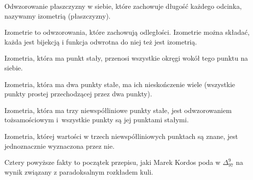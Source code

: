 
\begin{definition}
    Odwzorowanie płaszczyzny w siebie, które zachowuje długość każdego odcinka, nazywamy izometrią (płaszczyzny).
\end{definition}

Izometrie to odwzorowania, które zachowują odległości.
Izometrie można składać, każda jest bijekcją i funkcja odwrotna do niej też jest izometrią.

\begin{proposition}
\label{delta_1997_9_start}%
    Izometria, która ma punkt stały, przenosi wszystkie okręgi wokół tego punktu na siebie.
\end{proposition}

\begin{proposition}
    Izometria, która ma dwa punkty stałe, ma ich nieskończenie wiele (wszystkie punkty prostej przechodzącej przez dwa punkty).
\end{proposition}

\begin{proposition}
    Izometria, która ma trzy niewspółliniowe punkty stałe, jest odwzorowaniem tożsamościowym i~wszystkie punkty są jej punktami stałymi.
\end{proposition}

\begin{proposition}
\label{delta_1997_9_end}%
    Izometria, której wartości w trzech niewspółliniowych punktach są znane, jest jednoznacznie wyznaczona przez nie.
\end{proposition}

Cztery powyższe fakty to początek przepisu, jaki Marek Kordos poda w $\Delta_{97}^9$ na wynik związany z paradoksalnym rozkładem kuli.